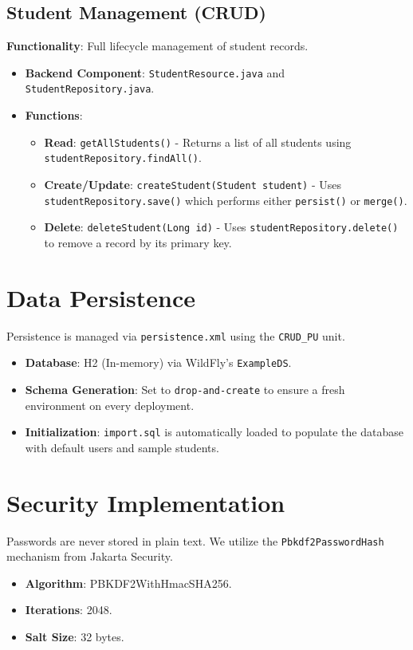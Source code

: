 \documentclass[12pt,a4paper]{article}
\begin{document}
\subsection{Student Management (CRUD)}
\textbf{Functionality}: Full lifecycle management of student records.
\begin{itemize}
    \item \textbf{Backend Component}: \texttt{StudentResource.java} and \texttt{StudentRepository.java}.
    \item \textbf{Functions}:
    \begin{itemize}
        \item \textbf{Read}: \texttt{getAllStudents()} - Returns a list of all students using \texttt{studentRepository.findAll()}.
        \item \textbf{Create/Update}: \texttt{createStudent(Student student)} - Uses \texttt{studentRepository.save()} which performs either \texttt{persist()} or \texttt{merge()}.
        \item \textbf{Delete}: \texttt{deleteStudent(Long id)} - Uses \texttt{studentRepository.delete()} to remove a record by its primary key.
    \end{itemize}
\end{itemize}

\section{Data Persistence}
Persistence is managed via \texttt{persistence.xml} using the \texttt{CRUD\_PU} unit.
\begin{itemize}
    \item \textbf{Database}: H2 (In-memory) via WildFly's \texttt{ExampleDS}.
    \item \textbf{Schema Generation}: Set to \texttt{drop-and-create} to ensure a fresh environment on every deployment.
    \item \textbf{Initialization}: \texttt{import.sql} is automatically loaded to populate the database with default users and sample students.
\end{itemize}

\section{Security Implementation}
Passwords are never stored in plain text. We utilize the \texttt{Pbkdf2PasswordHash} mechanism from Jakarta Security.
\begin{itemize}
    \item \textbf{Algorithm}: PBKDF2WithHmacSHA256.
    \item \textbf{Iterations}: 2048.
    \item \textbf{Salt Size}: 32 bytes.
\end{itemize}
\end{document}
